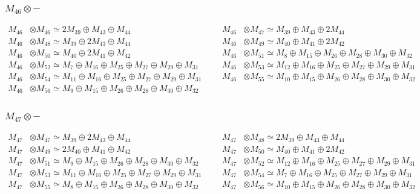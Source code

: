 \subsubsection{$ M_{46}\otimes -$}
\begin{align*}
M_{46} &\otimes M_{46} \simeq 2M_{39} \oplus M_{43} \oplus M_{44} &&& M_{46} &\otimes M_{47} \simeq M_{39} \oplus M_{43} \oplus 2M_{44}\\
M_{46} &\otimes M_{48} \simeq M_{39} \oplus 2M_{43} \oplus M_{44} &&& M_{46} &\otimes M_{49} \simeq M_{40} \oplus M_{41} \oplus 2M_{42}\\
M_{46} &\otimes M_{50} \simeq M_{40} \oplus 2M_{41} \oplus M_{42} &&& M_{46} &\otimes M_{51} \simeq M_{8} \oplus M_{15} \oplus M_{26} \oplus M_{28} \oplus M_{30} \oplus M_{32}\\
M_{46} &\otimes M_{52} \simeq M_{7} \oplus M_{16} \oplus M_{25} \oplus M_{27} \oplus M_{29} \oplus M_{31} &&& M_{46} &\otimes M_{53} \simeq M_{12} \oplus M_{16} \oplus M_{25} \oplus M_{27} \oplus M_{29} \oplus M_{31}\\
M_{46} &\otimes M_{54} \simeq M_{11} \oplus M_{16} \oplus M_{25} \oplus M_{27} \oplus M_{29} \oplus M_{31} &&& M_{46} &\otimes M_{55} \simeq M_{10} \oplus M_{15} \oplus M_{26} \oplus M_{28} \oplus M_{30} \oplus M_{32}\\
M_{46} &\otimes M_{56} \simeq M_{9} \oplus M_{15} \oplus M_{26} \oplus M_{28} \oplus M_{30} \oplus M_{32}
\end{align*}

\subsubsection{$ M_{47}\otimes -$}
\begin{align*}
M_{47} &\otimes M_{47} \simeq M_{39} \oplus 2M_{43} \oplus M_{44} &&& M_{47} &\otimes M_{48} \simeq 2M_{39} \oplus M_{43} \oplus M_{44}\\
M_{47} &\otimes M_{49} \simeq 2M_{40} \oplus M_{41} \oplus M_{42} &&& M_{47} &\otimes M_{50} \simeq M_{40} \oplus M_{41} \oplus 2M_{42}\\
M_{47} &\otimes M_{51} \simeq M_{9} \oplus M_{15} \oplus M_{26} \oplus M_{28} \oplus M_{30} \oplus M_{32} &&& M_{47} &\otimes M_{52} \simeq M_{12} \oplus M_{16} \oplus M_{25} \oplus M_{27} \oplus M_{29} \oplus M_{31}\\
M_{47} &\otimes M_{53} \simeq M_{11} \oplus M_{16} \oplus M_{25} \oplus M_{27} \oplus M_{29} \oplus M_{31} &&& M_{47} &\otimes M_{54} \simeq M_{7} \oplus M_{16} \oplus M_{25} \oplus M_{27} \oplus M_{29} \oplus M_{31}\\
M_{47} &\otimes M_{55} \simeq M_{8} \oplus M_{15} \oplus M_{26} \oplus M_{28} \oplus M_{30} \oplus M_{32} &&& M_{47} &\otimes M_{56} \simeq M_{10} \oplus M_{15} \oplus M_{26} \oplus M_{28} \oplus M_{30} \oplus M_{32}\\
\end{align*}

